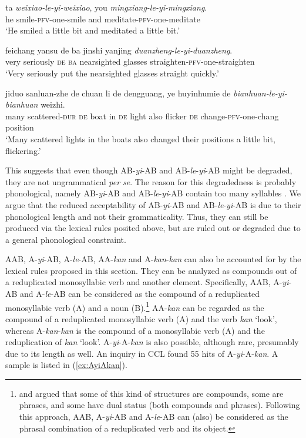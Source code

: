 \documentclass[11pt,a4paper,fleqn,draft]{article}
\let\textbf\emph
\begin{document}
 \ea\label{ex:AByiAB-rou2}
 \gll ta \textbf{weixiao-le-yi-weixiao}, you \textbf{mingxiang-le-yi-mingxiang}.\footnotemark\\
 he smile-\textsc{pfv}-one-smile and meditate-\textsc{pfv}-one-meditate\\
 \glt `He smiled a little bit and meditated a little bit.'
 
 \ex\label{ex:AByiAB-li}
 \gll feichang yansu de ba jinshi yanjing \textbf{duanzheng-le-yi-duanzheng}.\footnotemark\\
 very seriously \textsc{de} \textsc{ba} nearsighted glasses straighten-\textsc{pfv}-one-straighten\\
 \glt `Very seriously put the nearsighted glasses straight quickly.'
 
 \ex\label{ex:ABleyiAB-ccl}
 \gll jiduo sanluan-zhe de chuan li de dengguang, ye huyinhumie de \textbf{bianhuan-le-yi-bianhuan} weizhi.\\
  many scattered-\textsc{dur} \textsc{de} boat in \textsc{de} light also flicker \textsc{de} change-\textsc{pfv}-one-chang position\\ 
 \glt `Many scattered lights in the boats also changed their positions a little bit, flickering.'
 \z
\z

This suggests that  even though AB-\emph{yi}-AB and AB-\emph{le}-\emph{yi}-AB might be degraded, they are not ungrammatical \emph{per se}.
The reason for this degradedness is probably phonological, namely  AB-\emph{yi}-AB and AB-\emph{le}-\emph{yi}-AB contain too many syllables \citetext{\citealp[274]{Fan1964}, \citealp[143]{Sui2018}, \citealp[239]{YangWei2017}, \citealp[15]{Zhang2000}}.
We argue that  the reduced acceptability of AB-\emph{yi}-AB and AB\hyp{}\emph{le}\hyp{}\emph{yi}\hyp{}AB is due to their phonological length and not their grammaticality.
Thus, they can still be produced via the lexical rules posited above, but are ruled out or degraded due to a general phonological constraint.


AAB, A-\emph{yi}-AB, A-\emph{le}-AB, AA-\emph{kan} and A-\emph{kan}-\emph{kan} can also be accounted for by the lexical rules proposed in this section.
They can be analyzed as compounds out of a reduplicated monosyllabic verb and another element.
Specifically, AAB, A-\emph{yi}-AB and A-\emph{le}-AB can be considered as the compound of a reduplicated monosyllabic verb (A) and a noun (B).\footnote{
\citet{Huang1984} and \citet{Her1996, Her2010} argued that some of this kind of structures are compounds, some are phrases, and some have dual status (both compounds and phrases).
Following this approach, AAB, A-\emph{yi}-AB and A-\emph{le}-AB can (also) be considered as the phrasal combination of a reduplicated verb and its object.
}
AA-\emph{kan} can be regarded as the compound of a reduplicated monosyllabic verb (A) and the verb \emph{kan} `look',
whereas A-\emph{kan}-\emph{kan} is the compound of a monosyllabic verb (A) and the reduplication of \emph{kan} `look'.
A-\emph{yi}-A-\emph{kan} is also possible, although rare, presumably due to its length as well.
An inquiry in CCL found 55 hits of A-\emph{yi}-A-\emph{kan}.
A sample is listed in (\ref{ex:AyiAkan}).
\end{document}
